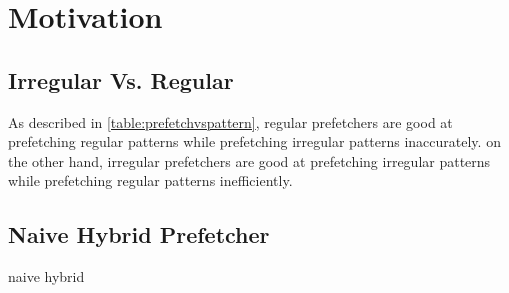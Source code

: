 \section{Motivation}
\label{sec:motivation}


  \subsection{Irregular Vs. Regular}
  \label{sec:irrVsre}
  As described in \ref{table:prefetchvspattern}, regular prefetchers are good at prefetching regular patterns while prefetching irregular patterns inaccurately. on the other hand, irregular prefetchers are good at prefetching irregular patterns while prefetching regular patterns inefficiently.

  \subsection{Naive Hybrid Prefetcher}
  \label{sec:naivehy}
  naive hybrid
